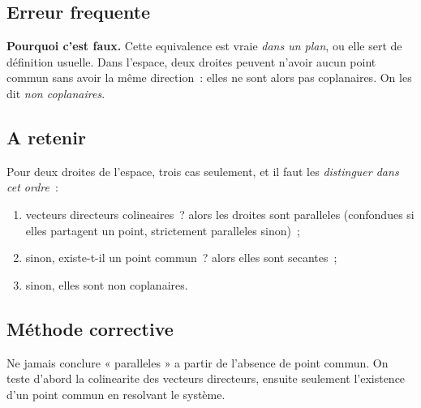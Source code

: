 

\subsection*{Erreur frequente}


\textbf{Pourquoi c'est faux.} Cette equivalence est vraie \emph{dans un plan},
ou elle sert de définition usuelle. Dans l'espace, deux droites peuvent
n'avoir aucun point commun sans avoir la même direction~: elles ne sont alors
pas coplanaires. On les dit \emph{non coplanaires}.


\subsection*{A retenir}

Pour deux droites de l'espace, trois cas seulement, et il faut les
\emph{distinguer dans cet ordre}~:

\begin{enumerate}
  \item vecteurs directeurs colineaires~? alors les droites sont paralleles
        (confondues si elles partagent un point, strictement paralleles sinon)~;
  \item sinon, existe-t-il un point commun~? alors elles sont secantes~;
  \item sinon, elles sont non coplanaires.
\end{enumerate}

\subsection*{Méthode corrective}

Ne jamais conclure « paralleles » a partir de l'absence de point commun. On
teste d'abord la colinearite des vecteurs directeurs, ensuite seulement
l'existence d'un point commun en resolvant le système.

